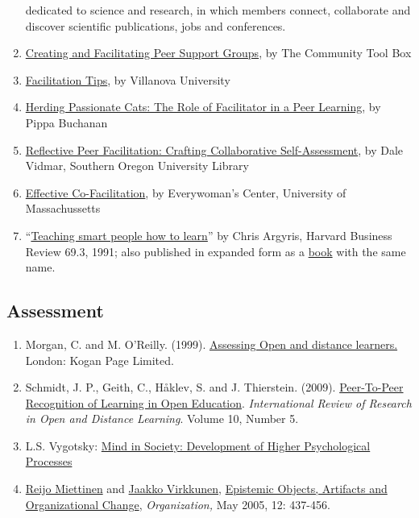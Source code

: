 \begin{enumerate}
  dedicated to science and research, in which members connect,
  collaborate and discover scientific publications, jobs and
  conferences.
\item
  \href{http://ctb.ku.edu/en/tablecontents/section\_1180.aspx}{Creating
  and Facilitating Peer Support Groups}, by The Community Tool Box
\item
  \href{http://www1.villanova.edu/content/villanova/artsci/vcle/resources/toolkit/\_jcr\_content/pagecontent/download\_8/file.res/FacilitationTips.doc}{Facilitation
  Tips}, by Villanova University
\item
  \href{http://pippabuchanan.com/2011/09/04/herding-passionate-cats-the-role-of-facilitator-in-a-peer-learning-process/}{Herding
  Passionate Cats: The Role of Facilitator in a Peer Learning}, by Pippa
  Buchanan
\item
  \href{http://webpages.sou.edu/~vidmar/SOARS2008/vidmar.ppt}{Reflective
  Peer Facilitation: Crafting Collaborative Self-Assessment}, by Dale
  Vidmar, Southern Oregon University Library
\item
  \href{http://www.umass.edu/ewc/ea/Facilitation\%20Skills/important\%20tips.doc}{Effective
  Co-Facilitation}, by Everywoman's Center, University of Massachussetts
\item
  ``\href{www.ncsu.edu/park\_scholarships/pdf/chris\_argyris\_learning.pdf?}{Teaching
  smart people how to learn}'' by Chris Argyris, Harvard Business Review
  69.3, 1991; also published in expanded form as a
  \href{http://www.amazon.com/Teaching-People-Harvard-Business-Classics/dp/1422126005}{book}
  with the same name.
\end{enumerate}
\subsection{Assessment}

\begin{enumerate}
\item
  Morgan, C. and M. O'Reilly. (1999).
  \href{http://www.amazon.com/Assessing-Distance-Learners-Flexible-Learning/dp/0749428783/ref=tmm\_pap\_title\_0?ie=UTF8\&qid=1388199564\&sr=1-1}{Assessing
  Open and distance learners.} London: Kogan Page Limited.
\item
  Schmidt, J. P., Geith, C., Håklev, S. and J. Thierstein. (2009).
  \href{http://www.irrodl.org/index.php/irrodl/article/view/641/1389}{Peer-To-Peer
  Recognition of Learning in Open Education}. \emph{International Review
  of Research in Open and Distance Learning}. Volume 10, Number 5.
\item
  L.S. Vygotsky:
  \href{http://books.google.com/books?id=RxjjUefze\_oC\&printsec=frontcover\&source=gbs\_atb\#v=onepage\&q\&f=false}{Mind
  in Society: Development of Higher Psychological Processes}
\item
  \href{http://org.sagepub.com/search?author1=Reijo+Miettinen\&sortspec=date\&submit=Submit}{Reijo
  Miettinen} and
  \href{http://org.sagepub.com/search?author1=Jaakko+Virkkunen\&sortspec=date\&submit=Submit}{Jaakko
  Virkkunen},
  \href{http://org.sagepub.com/content/12/3/437.abstract}{Epistemic
  Objects, Artifacts and Organizational Change}, \emph{Organization,}
  May 2005, 12: 437-456.
\end{enumerate}
